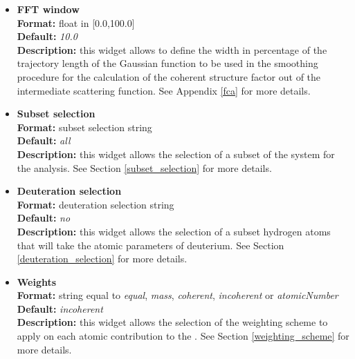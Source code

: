 \documentclass[a4paper,11pt]{report}
\newcommand{\qshells}{\textit{q}-shells}
\begin{document}
\begin{itemize}
For example,
\begin{itemize}
\item \textit{0:10:1} will generate \qshells\ of radii 0, 1, 2, 3, 4, 5, 6, 7, 8, 9, 10.
\item \textit{3:12:2} will generate \qshells\ of radii 3, 5, 7, 9, 11.
\end{itemize}

\hypertarget{disfg_fft_window}{}
\item \textbf{FFT window}\\
\textbf{Format:} float in [0.0,100.0]\\
\textbf{Default:} \textit{10.0}\\
\textbf{Description:} this widget allows to define the width in percentage of the trajectory length of the Gaussian 
function to be used in the smoothing procedure for the calculation of the coherent structure factor out of the intermediate 
scattering function. See Appendix \ref{fca} for more details.

\hypertarget{disfg_subset_selection}{}
\item \textbf{Subset selection}\\
\textbf{Format:} subset selection string\\
\textbf{Default:} \textit{all}\\
\textbf{Description:} this widget allows the selection of a subset of the system for the analysis. 
See Section \ref{subset_selection} for more details.

\hypertarget{disfg_deuteration_selection}{}
\item \textbf{Deuteration selection}\\
\textbf{Format:} deuteration selection string\\
\textbf{Default:} \textit{no}\\
\textbf{Description:} this widget allows the selection of a subset hydrogen atoms that will take the atomic parameters 
of deuterium. See Section \ref{deuteration_selection} for more details.

\hypertarget{disfg_weights}{}
\item \textbf{Weights}\\
\textbf{Format:} string equal to \textit{equal}, \textit{mass}, \textit{coherent}, \textit{incoherent} or \textit{atomicNumber}\\
\textbf{Default:} \textit{incoherent}\\
\textbf{Description:} this widget allows the selection of the weighting scheme to apply on each atomic contribution 
to the \DISFG . See Section \ref{weighting_scheme} for more details. 


\end{itemize}
\end{document}
